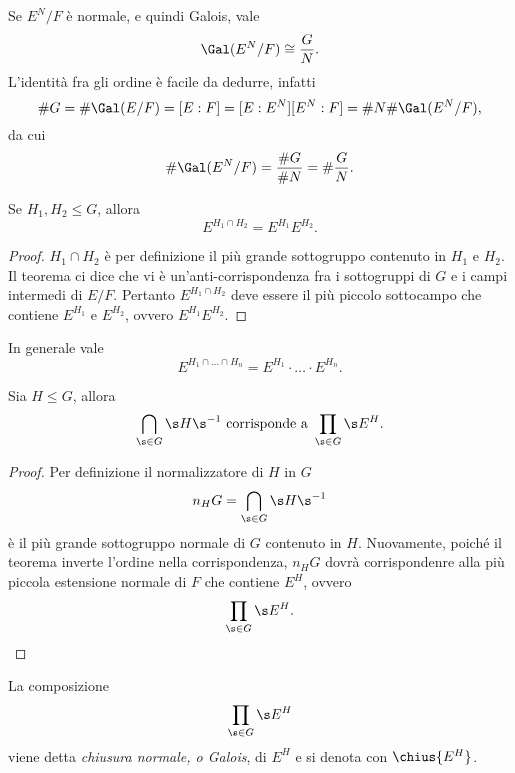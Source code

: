 \begin{oss}
	Se \(E^N/F\) è normale, e quindi Galois, vale
	\[
		\Gal(E^N/F) \cong \frac{G}{N}.
	\]
	L'identità fra gli ordine è facile da dedurre, infatti
	\[
		\#G = \#\Gal(E/F) = [E:F] = [E:E^N][E^N:F] = \#N \#\Gal(E^N/F),
	\]
	da cui
	\[
		\#\Gal(E^N/F) = \frac{\#G}{\#N} = \# \frac{G}{N}.
	\]
\end{oss}

\begin{pr}\label{TFCG5}
	Se \(H_1,H_2\le G\), allora
	\[
		E^{H_1\cap H_2} = E^{H_1}E^{H_2}.
	\]
\end{pr}

\begin{proof}
	\(H_1\cap H_2\) è per definizione il più grande sottogruppo contenuto in \(H_1\) e \(H_2\).
	Il teorema ci dice che vi è un'anti-corrispondenza fra i sottogruppi di \(G\) e i campi intermedi di \(E/F\). Pertanto \(E^{H_1\cap H_2}\) deve essere il più piccolo sottocampo che contiene \(E^{H_1}\) e \(E^{H_2}\), ovvero \(E^{H_1}E^{H_2}\).
\end{proof}

\begin{oss}
	In generale vale
	\[
		E^{H_1 \cap \ldots \cap H_n} = E^{H_1}\cdot\ldots\cdot E^{H_n}.
	\]
\end{oss}

\begin{pr}\label{TFCG6}
	Sia \(H\le G\), allora
	\[
		\bigcap_{\s\in G} \s H \s^{-1} \text{ corrisponde a } \prod_{\s\in G}\s E^H.\qedhere
	\]
\end{pr}

\begin{proof}
	Per definizione il normalizzatore di \(H\) in \(G\)
	\[
		n_H G = \bigcap_{\s\in G} \s H \s^{-1}
	\]
	è il più grande sottogruppo normale di \(G\) contenuto in \(H\). Nuovamente, poiché il teorema inverte l'ordine nella corrispondenza, \(n_H G\) dovrà corrispondenre alla più piccola estensione normale di \(F\) che contiene \(E^H\), ovvero
	\[
		\prod_{\s\in G}\s E^H.\qedhere
	\]
\end{proof}

\begin{notz}
	La composizione
	\[
		\prod_{\s\in G}\s E^H
	\]
	viene detta \emph{chiusura normale, o Galois}, di \(E^H\) e si denota con \(\chius{E^H}\).
\end{notz}